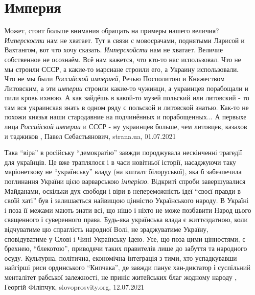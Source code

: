  
 
 
 
 
\chapter{Империя}
\label{sec:slova.imperia}

Может, стоит больше внимания обращать на примеры нашего величия?
\emph{Имперскости} нам не хватает. Тут в связи с мовосрачами, поднятыми
Ларисой и Вахтангом, вот что хочу сказать.  \emph{Имперскойсти} нам не хватает.
Величие собственное не осознаём. Всё нам кажется, что кто-то нас использовал.
Что не мы строили СССР, а какие-то марсиане строили его, а Украину
использовали. Что не мы были \emph{Российской империей}, Речью Посполитою и
Княжеством Литовским, а эти \emph{империи} строили какие-то чужинци, а
украинцев порабощали и пили кровь ихнюю.  А как зайдёшь в какой-то музей
польский или литовский - то там вся украинская знать в одном ряду с польской и
литовской знатью. Как-то не похожи князья наши стародавние на подчинённых и
порабощенных... А первыхе лица \emph{Российской империи} и СССР - ну украинцев
больше, чем литовцев, казахов и таджиков
, 
Павел Себастьянович, strana.ua, 01.07.2021

Така \enquote{віра} в російську \enquote{демократію} завжди породжувала нескінченні трагедії
для українців. Це вже траплялося і в часи новітньої історії, насаджуючи таку
маріонеткову не \enquote{українську} владу (на кшталт білоруської), яка б забезпечила
поглинання України цією варварською \emph{імперією}.  Відкриті спроби завершувалися
Майданами, оскільки дух свободи і віри в непереможність ідеї \enquote{своєї правди в
своїй хаті} був і залишається найвищою цінністю Українського народу. В Україні
і поза її межами мають знати всі, що ніщо і ніхто не може позбавити Народ цього
священного і суверенного права. Будь-яка українська влада є життєздатною, коли
відчуватиме цю спраглість народної Волі, не зраджуватиме Україну, сповідуватиме
у Слові і Чині Українську Ідею. Усе, що поза цими цінностями, є брехнею,
\enquote{блекотою}, приводячи таких правителів лише до забуття та народного осуду.
Культурна, політична, економічна інтеграція з тими, хто успадкувавши найгірші
риси ординського \enquote{Кипчака}, де завжди панує хан-диктатор і суспільний
менталітет рабської залежності, не приніс житейських благ жодному народу
, Георгій Філіпчук, slovoprosvity.org, 12.07.2021
